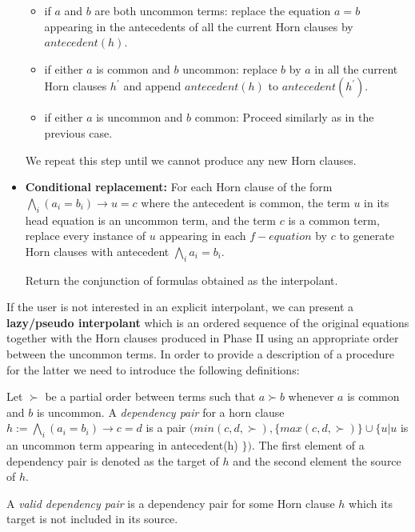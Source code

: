 \begin{itemize}
    \begin{itemize}
      \item if $a$ and $b$ are both uncommon terms:
        replace the equation $a = b$ appearing in the antecedents
        of all the current Horn clauses by $antecedent(h)$.
      \item if either $a$ is common and $b$ uncommon: replace $b$ by $a$
        in all the current Horn clauses $h^{'}$ and append $antecedent(h)$ to 
        $antecedent(h^{'})$.
      \item if either $a$ is uncommon and $b$ common: Proceed similarly as in the
        previous case.
    \end{itemize}

    We repeat this step until we cannot produce any new Horn clauses. 

  \item \textbf{Conditional replacement:} 
    For each Horn clause of the form $\bigwedge_i(a_i = b_i) 
    \rightarrow u = c$ 
    where the antecedent is common, the term $u$ in its 
    head equation is an uncommon term,
    and the term $c$ is a common term, 
    replace every instance of $u$ appearing in each 
    $f-equation$ by $c$ to generate Horn clauses with 
    antecedent $\bigwedge_i a_i = b_i$.

    Return the conjunction of formulas obtained 
    as the interpolant.
\end{itemize}

If the user is not interested in an explicit interpolant, 
we can present a \textbf{lazy/pseudo interpolant}
which is an ordered sequence of the original equations 
together with the Horn clauses produced in Phase II 
using an appropriate order between the uncommon terms. In order to
provide a description of a procedure for the latter we need
to introduce the following definitions:

\begin{definition}\label{dep_pair}
  Let $\succ$ be a partial order between terms 
  such that $a \succ b$ whenever 
  $a$ is common and $b$ is uncommon. A \emph{dependency pair}
  for a horn clause $h := \bigwedge_i (a_i = b_i) \rightarrow c = d$
  is a pair $(min(c, d, \succ), \{max(c, d, \succ)\} \cup \{ u | u$ 
  is an uncommon term appearing in antecedent(h) $\})$.
  The first element of a dependency pair is denoted as the
  target of $h$ and the second element the source of $h$.

  A \emph{valid dependency pair} is a dependency pair for some
  Horn clause $h$ which its target is not included in its
  source.
\end{definition}

